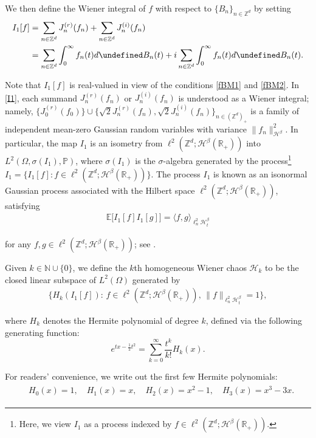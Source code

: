 \documentclass[letterpaper, 11pt,  reqno]{amsart}
\newcommand{\1}{\hspace{0.5mm}\textup{I}\hspace{0.5mm}}
\newcommand{\noi}{\noindent}
\newcommand{\Z}{\mathbb{Z}}
\newcommand{\R}{\mathbb{R}}
\let\Re=\undefined\DeclareMathOperator*{\Re}{Re}
\let\Im=\undefined\DeclareMathOperator*{\Im}{Im}
\newcommand{\PP}{\mathbb{P}}
\newcommand{\E}{\mathbb{E}}
\newcommand{\be}{\beta}
\newcommand{\s}{\sigma}
\renewcommand{\l}{\ell}
\newcommand{\jb}[1]
{\langle #1 \rangle}
\newcommand{\N}{\mathbb{N}}
\newcommand{\Hs}{\mathscr{H}}
\newcommand{\HH}{\mathcal{H}}
\numberwithin{equation}{section}
\numberwithin{theorem}{section}
\begin{document}
\noi
We then define the Wiener integral  of $f$
 with respect to $\{B_n\}_{n\in\Z^d}$
 by setting
\begin{align}
\begin{split}
I_1[f]  
& =  \sum_{n\in \Z^d}J_n^{(r)}(f_n)
+ \sum_{n\in \Z^d}J_n^{(i)}(f_n)\\
& = \sum_{n\in \Z^d} \int _0^\infty f_n(t) d \Re B_n(t)
+ i 
 \sum_{n\in \Z^d}
\int _0^\infty f_n(t) d \Im B_n(t).
\end{split}
\label{I1}
\end{align}


\noi
Note that $I_1[f]$ is real-valued
in view of the conditions \eqref{fBM1} and \eqref{fBM2}.
In \eqref{I1},  each summand $J_n^{(r)}(f_n)$ 
or $J_n^{(i)}(f_n)$ is  understood as a Wiener integral;
namely, $\{J_0^{(r)}(f_0)\}\cup\{\sqrt 2 J_n^{(r)}(f_n), \sqrt 2 J_n^{(i)}(f_n)\}_{n \in (\Z^d)_{+}}$ is a family of independent mean-zero Gaussian random variables
with variance $\|f_n\|_{\Hs^\be}^2$.
In particular,  
the map $I_1$ is an isometry from 
$\l^2(\Z^d;\Hs^\be(\R_+))$ into $L^2(\Omega, \s(I_1) , \PP)$, where $\s(I_1)$ is the $\s$-algebra generated by the process\footnote{Here, we view $I_1$ as a process
indexed by  $f \in \l^2(\Z^d;\Hs^\be(\R_+))$.}
$I_1= \{I_1[f]: f \in \l^2(\Z^d;\Hs^\be(\R_+))\}$. 
The process $I_1$ is known as an isonormal Gaussian process associated with the Hilbert space 
$\l^2(\Z^d;\Hs^\be(\R_+))$,  satisfying
\begin{align*}
\E\big[I_1[f] I_1[g]\big] = \jb{f,g}_{\l^2_n \Hs_t^\be }
\end{align*}

\noi
for any $f,g\in 
\l^2(\Z^d;\Hs^\be(\R_+))$;
see \cite[Definition 1.1.1]{Nualart06}.


Given $k \in \N \cup\{0\}$, 
we define the $k$th homogeneous Wiener chaos $\HH_k$ 
to be  the closed linear subspace of $L^2(\Omega)$ generated by
\begin{align*}
\big\{ H_k(I_1[f]) : \, f\in \l^2(\Z^d;\Hs^\be(\R_+)),  \, \|f\|_{\l^2_n\Hs^\be_t} = 1   \big\},
\end{align*}

\noi
where $H_k$ denotes the  Hermite polynomial of degree $k$, 
defined via the following generating function:
\begin{equation*}
 e^{tx - \frac{1}{2} t^2} = \sum_{k = 0}^\infty \frac{t^k}{k!} H_k(x).
 \end{equation*}
	
\noi
For readers' convenience, we write out the first few Hermite polynomials:
\begin{align*}
\begin{split}
& H_0(x) = 1, 
\quad 
H_1(x) = x, 
\quad
H_2(x) = x^2 - 1,   
\quad
 H_3(x) = x^3 - 3 x.
\end{split}
\end{align*}
\end{document}
